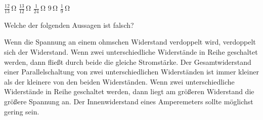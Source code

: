 \documentclass[11pt]{exam}
\begin{document}
\begin{questions}
\begin{choices}
	\choice \(\mathrm{\frac{12}{13}\,\Omega}\)
	\choice \(\mathrm{\frac{13}{12}\,\Omega}\)
	\choice \(\mathrm{\frac{1}{24}\,\Omega}\)
	\choice \(\mathrm{9\,\Omega}\)
	\choice \(\mathrm{\frac{1}{9}\,\Omega}\)
\end{choices}

\vspace{3mm}\question Welche der folgenden Aussagen ist falsch?

\begin{choices}
	\choice Wenn die Spannung an einem ohmschen Widerstand verdoppelt wird, verdoppelt sich der Widerstand.
	\choice Wenn zwei unterschiedliche Widerstände in Reihe geschaltet werden, dann fließt durch beide die gleiche Stromstärke.
	\choice Der Gesamtwiderstand einer Parallelschaltung von zwei unterschiedlichen Widerständen ist immer kleiner als der kleinere von den beiden Widerständen.
	\choice Wenn zwei unterschiedliche Widerstände in Reihe geschaltet werden, dann liegt am größeren Widerstand die größere Spannung an.
	\choice Der Innenwiderstand eines Amperemeters sollte möglichst gering sein.
\end{choices}

\vspace{3mm}\end{questions}
\end{document}

